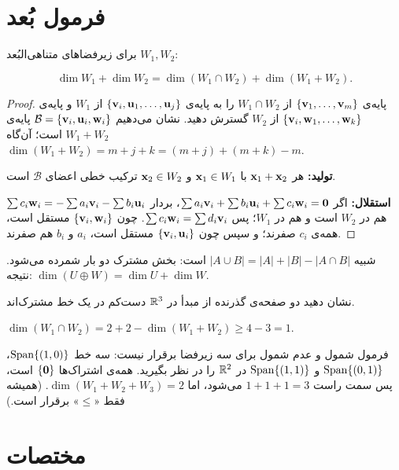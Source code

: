 \section{فرمول بُعد}

\begin{theorem}[فرمول بُعد]\label{thm:dim-formula}
برای زیرفضاهای متناهی‌البُعد $W_1,W_2$:
\begin{keyformula}
\[
\dim W_1+\dim W_2=\dim(W_1\cap W_2)+\dim(W_1+W_2).
\]
\end{keyformula}
\end{theorem}
\begin{proof}
پایه‌ی $\{\mathbf{v}_1,\dots,\mathbf{v}_m\}$ از $W_1\cap W_2$ را به پایه‌ی $\{\mathbf{v}_i,\mathbf{u}_1,\dots,\mathbf{u}_j\}$ از $W_1$ و پایه‌ی $\{\mathbf{v}_i,\mathbf{w}_1,\dots,\mathbf{w}_k\}$ از $W_2$ گسترش دهید. نشان می‌دهیم $\mathcal{B}=\{\mathbf{v}_i,\mathbf{u}_i,\mathbf{w}_i\}$ پایه‌ی $W_1+W_2$ است؛ آن‌گاه $\dim(W_1+W_2)=m+j+k=(m+j)+(m+k)-m$.

\textbf{تولید:} هر $\mathbf{x}_1+\mathbf{x}_2$ با $\mathbf{x}_1\in W_1$ و $\mathbf{x}_2\in W_2$ ترکیب خطی  اعضای $\mathcal{B}$ است.

\textbf{استقلال:} اگر $\sum a_i\mathbf{v}_i+\sum b_i\mathbf{u}_i+\sum c_i\mathbf{w}_i=\mathbf{0}$، بردار $\sum c_i\mathbf{w}_i=-\sum a_i\mathbf{v}_i-\sum b_i\mathbf{u}_i$ هم در $W_2$ است و هم در $W_1$؛ پس $\sum c_i\mathbf{w}_i=\sum d_i\mathbf{v}_i$. چون $\{\mathbf{v}_i,\mathbf{w}_i\}$ مستقل است، همه‌ی $c_i$ صفرند؛ و سپس چون $\{\mathbf{v}_i,\mathbf{u}_i\}$ مستقل است، $a_i$ و $b_i$ هم صفرند.
\end{proof}

\begin{intuition}
شبیه $|A\cup B|=|A|+|B|-|A\cap B|$ است: بخش مشترک دو بار شمرده می‌شود. نتیجه: $\dim(U\oplus W)=\dim U+\dim W$.
\end{intuition}

\begin{example}
نشان دهید دو صفحه‌ی گذرنده از مبدأ در $\mathbb{R}^3$ دست‌کم در یک خط مشترک‌اند.
\end{example}
\begin{solution}
$\dim(W_1\cap W_2)=2+2-\dim(W_1+W_2)\ge4-3=1$.
\end{solution}

\begin{warning}[سه زیرفضا]
فرمول شمول و عدم شمول برای سه زیرفضا برقرار نیست: سه خط $\operatorname{Span}\{(1,0)\}$، $\operatorname{Span}\{(0,1)\}$ و $\operatorname{Span}\{(1,1)\}$ در $\mathbb{R}^2$ را در نظر بگیرید. همه‌ی اشتراک‌ها $\{\mathbf{0}\}$ است، پس سمت راست $1+1+1=3$ می‌شود، اما $\dim(W_1+W_2+W_3)=2$. (همیشه فقط «$\le$» برقرار است.)
\end{warning}

\section{مختصات}

